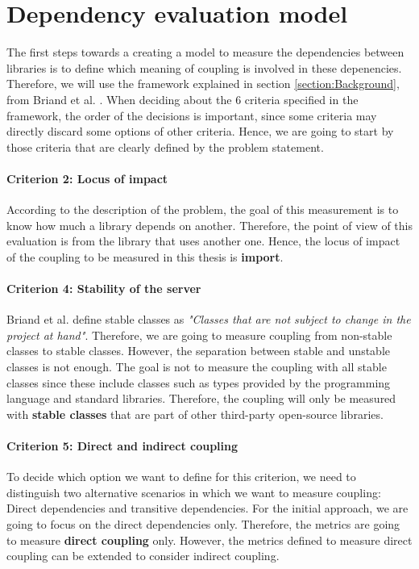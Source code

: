 \documentclass[a4paper]{article}
\begin{document}
\section{Dependency evaluation model}
The first steps towards a creating a model to measure the dependencies between libraries is to define which meaning of coupling is involved in these depenencies. Therefore, we will use the framework explained in section \ref{section:Background}, from Briand et al. \cite{briand1999unified}. When deciding about the 6 criteria specified in the framework, the order of the decisions is important, since some criteria may directly discard some options of other criteria. Hence, we are going to start by those criteria that are clearly defined by the problem statement.

\paragraph{Criterion 2: Locus of impact}
According to the description of the problem, the goal of this measurement is to know how much a library depends on another. Therefore, the point of view of this evaluation is from the library that uses another one. Hence, the locus of impact of the coupling to be measured in this thesis is \textbf{import}.

\paragraph{Criterion 4: Stability of the server}
Briand et al. \cite{briand1999unified} define stable classes as \textit{"Classes that are not subject to change in the project at hand"}. Therefore, we are going to measure coupling from non-stable classes to stable classes.
However, the separation between stable and unstable classes is not enough. The goal is not to measure the coupling with all stable classes since these include classes such as types provided by the programming language and standard libraries. Therefore, the coupling will only be measured with \textbf{stable classes} that are part of other third-party open-source libraries.

\paragraph{Criterion 5: Direct and indirect coupling}
To decide which option we want to define for this criterion, we need to distinguish two alternative scenarios in which we want to measure coupling: Direct dependencies and transitive dependencies. For the initial approach, we are going to focus on the direct dependencies only. Therefore, the metrics are going to measure \textbf{direct coupling} only. However, the metrics defined to measure direct coupling can be extended to consider indirect coupling.
\end{document}
